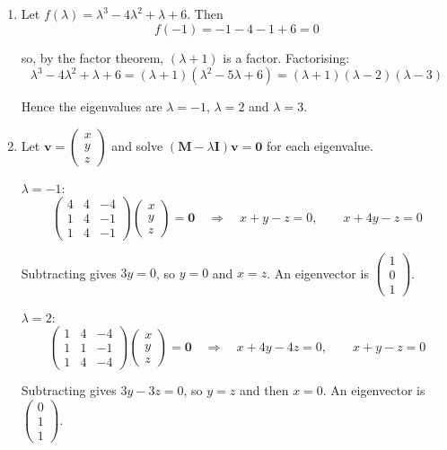 \documentclass[leqno]{article}
\begin{document}
\begin{enumerate}[
  label=\textbf{\arabic*.},
  leftmargin=*,
  topsep=0pt,
  partopsep=0pt,
  parsep=0pt
]
\begin{djsSolution}
\begin{enumerate}[label=\textbf{(\alph*)}, start=1]
Setting this equal to zero and multiplying by \(-1\) gives
\[
\lambda^3-4\lambda^2+\lambda+6=0
\]

as required.

  \item Let \(f(\lambda)=\lambda^3-4\lambda^2+\lambda+6\). Then
\[
f(-1)=-1-4-1+6=0
\]

so, by the factor theorem, \((\lambda+1)\) is a factor. Factorising:
\[
\lambda^3-4\lambda^2+\lambda+6=(\lambda+1)(\lambda^2-5\lambda+6)=(\lambda+1)(\lambda-2)(\lambda-3)
\]

Hence the eigenvalues are \(\lambda=-1\), \(\lambda=2\) and \(\lambda=3\).

  \item Let \(\mathbf{v}=\begin{pmatrix}x\\y\\z\end{pmatrix}\) and solve \((\mathbf{M}-\lambda\mathbf{I})\mathbf{v}=\mathbf{0}\) for each eigenvalue.

\(\lambda=-1\):
\[
\begin{pmatrix} 4 & 4 & -4 \\ 1 & 4 & -1 \\ 1 & 4 & -1 \end{pmatrix}\begin{pmatrix}x\\y\\z\end{pmatrix}=\mathbf{0}
\quad\Longrightarrow\quad x+y-z=0,\qquad x+4y-z=0
\]

Subtracting gives \(3y=0\), so \(y=0\) and \(x=z\). An eigenvector is \(\begin{pmatrix}1\\0\\1\end{pmatrix}\).

\(\lambda=2\):
\[
\begin{pmatrix} 1 & 4 & -4 \\ 1 & 1 & -1 \\ 1 & 4 & -4 \end{pmatrix}\begin{pmatrix}x\\y\\z\end{pmatrix}=\mathbf{0}
\quad\Longrightarrow\quad x+4y-4z=0,\qquad x+y-z=0
\]

Subtracting gives \(3y-3z=0\), so \(y=z\) and then \(x=0\). An eigenvector is \(\begin{pmatrix}0\\1\\1\end{pmatrix}\).


\end{enumerate}
\end{djsSolution}
\end{enumerate}
\end{document}
